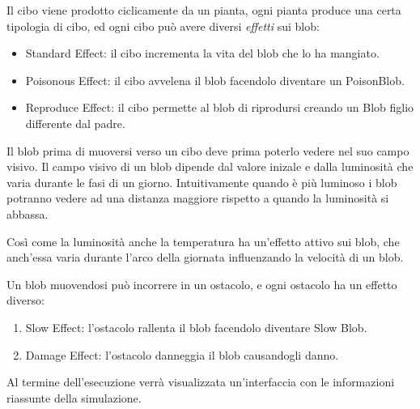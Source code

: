 Il cibo viene prodotto ciclicamente da un pianta, ogni pianta produce una certa tipologia di cibo, ed ogni cibo può avere diversi \textit{effetti} sui blob:
\begin{itemize}
    \item Standard Effect: il cibo incrementa la vita del blob che lo ha mangiato.
    \item Poisonous Effect: il cibo avvelena il blob facendolo diventare un PoisonBlob.
    \item Reproduce Effect: il cibo permette al blob di riprodursi creando un Blob figlio differente dal padre.
\end{itemize}

Il blob prima di muoversi verso un cibo deve prima poterlo vedere nel suo campo visivo. Il campo visivo di un blob dipende dal valore inizale e dalla luminosità che varia durante le fasi di un giorno. Intuitivamente quando è più luminoso i blob potranno vedere ad una distanza maggiore rispetto a quando la luminosità si abbassa.

Così come la luminosità anche la temperatura ha un'effetto attivo sui blob, che anch'essa varia durante l'arco della giornata influenzando la velocità di un blob.

Un blob muovendosi può incorrere in un ostacolo, e ogni ostacolo ha un effetto diverso:
\begin{enumerate}
    \item Slow Effect: l'ostacolo rallenta il blob facendolo diventare Slow Blob.
    \item Damage Effect: l'ostacolo danneggia il blob causandogli danno.
\end{enumerate}

Al termine dell'esecuzione verrà visualizzata un'interfaccia con le informazioni riassunte della simulazione.